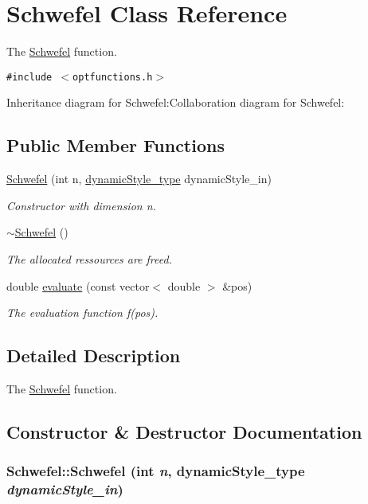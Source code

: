 \hypertarget{classSchwefel}{
\section{Schwefel Class Reference}
\label{classSchwefel}
}
The \hyperlink{classSchwefel}{Schwefel} function.  


{\tt \#include $<$optfunctions.h$>$}

Inheritance diagram for Schwefel:Collaboration diagram for Schwefel:\subsection*{Public Member Functions}
\begin{CompactItemize}
\item 
\hyperlink{classSchwefel_1708c135fc2383c0d59895a4b2235463}{Schwefel} (int n, \hyperlink{optfunctions_8h_ae9aa3a5dd199a43e77abc2cccf4477e}{dynamicStyle\_\-type} dynamicStyle\_\-in)
\begin{CompactList}\small\item\em Constructor with dimension n. \item\end{CompactList}\item 
\hyperlink{classSchwefel_1e98da63d923ae569891af1381a390f1}{$\sim$Schwefel} ()
\begin{CompactList}\small\item\em The allocated ressources are freed. \item\end{CompactList}\item 
double \hyperlink{classSchwefel_127479ba86b2a029c9f6811cf21faff2}{evaluate} (const vector$<$ double $>$ \&pos)
\begin{CompactList}\small\item\em The evaluation function f(pos). \item\end{CompactList}\end{CompactItemize}


\subsection{Detailed Description}
The \hyperlink{classSchwefel}{Schwefel} function. 

\subsection{Constructor \& Destructor Documentation}
\hypertarget{classSchwefel_1708c135fc2383c0d59895a4b2235463}{
\subsubsection{\setlength{\rightskip}{0pt plus 5cm}Schwefel::Schwefel (int {\em n}, \/  {\bf dynamicStyle\_\-type} {\em dynamicStyle\_\-in})}}
\label{classSchwefel_1708c135fc2383c0d59895a4b2235463}


